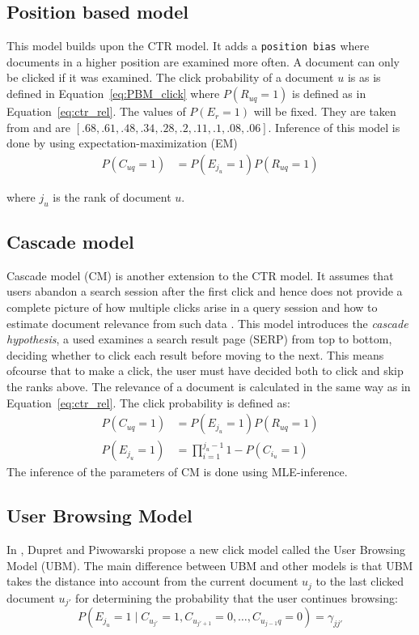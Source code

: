 \subsection{Position based model}
This model builds upon the CTR model. It adds a \texttt{position bias} where documents in a higher position are examined more often. A document can only be clicked if it was examined. The click probability of a document $u$ is as is defined in Equation~\ref{eq:PBM_click} where $P(R_{uq}=1)$ is defined as in Equation~\ref{eq:ctr_rel}. The values of $P(E_r=1)$ will be fixed. They are taken from \cite{eye_track} and are $[.68, .61, .48, .34, .28, .2, .11, .1, .08, .06]$. Inference of this model is done by using expectation-maximization (EM)
\begin{align}
	P(C_{uq}=1) &= P(E_{j_u}=1)P(R_{uq}=1) \label{eq:PBM_click}
\end{align}

where $j_u$ is the rank of document $u$.

\subsection{Cascade model}
Cascade model (CM) is another extension to the CTR model. It assumes that users abandon a search session after the first click and hence does not provide a complete picture of how multiple clicks arise in a query session and how to estimate document relevance from such data \cite{Kempe2008,Craswell2008}. This model introduces the \textit{cascade hypothesis}, a used examines a search result page (SERP) from top to bottom, deciding whether to click each result before moving to the next. This means ofcourse that to make a click, the user must have decided both to click and skip the ranks above. The relevance of a document is calculated in the same way as in Equation~\ref{eq:ctr_rel}. The click probability is defined as:
\begin{align}
	P(C_{uq}=1) &= P(E_{j_u}=1)P(R_{uq}=1) \label{eq:CM_click} \\
	P(E_{j_u}=1) &= \prod_{i=1}^{j_u-1} 1 - P(C_{i_u}=1) \nonumber
\end{align}
The inference of the parameters of CM is done using MLE-inference.

\subsection{User Browsing Model}
In \cite{Dupret2008}, Dupret and Piwowarski propose a new click model called the User Browsing Model (UBM). The main difference between UBM and other models is that UBM takes the distance into account from the current document \(u_j\) to the last clicked document \(u_{j'}\) for determining the probability that the user continues browsing:
\[P(E_{j_u} = 1 \mid C_{u_{j'}}=1, C_{u_{j'+1}}=0, \dots, C_{u_{j-1}q}=0) = \gamma_{jj'}\]

